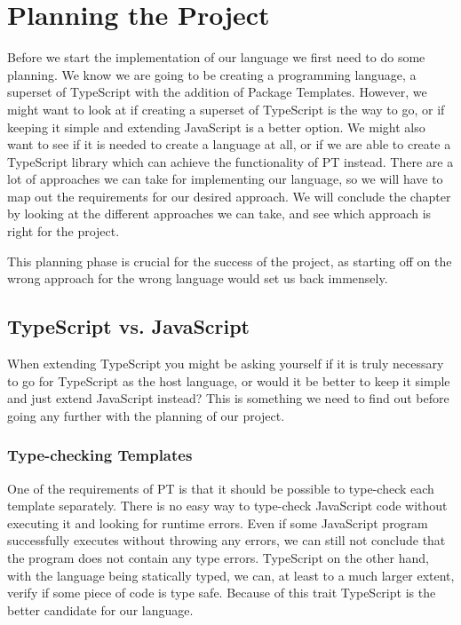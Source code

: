 
\chapter{Planning the Project}\label{ch:planning-the-project}

Before we start the implementation of our language we first need to do some planning.
We know we are going to be creating a programming language, a superset of TypeScript with the addition of Package Templates.
However, we might want to look at if creating a superset of TypeScript is the way to go, or if keeping it simple and extending JavaScript is a better option.
We might also want to see if it is needed to create a language at all, or if we are able to create a TypeScript library which can achieve the functionality of PT instead.
There are a lot of approaches we can take for implementing our language, so we will have to map out the requirements for our desired approach.
We will conclude the chapter by looking at the different approaches we can take, and see which approach is right for the project.

This planning phase is crucial for the success of the project, as starting off on the wrong approach for the wrong language would set us back immensely.

\section{TypeScript vs. JavaScript}\label{sec:typescript-vs-javascript}

When extending TypeScript you might be asking yourself if it is truly necessary to go for TypeScript as the host language, or would it be better to keep it simple and just extend JavaScript instead?
This is something we need to find out before going any further with the planning of our project.

\subsection{Type-checking Templates}\label{subsec:why-typescript-verifying-templates}

One of the requirements of PT is that it should be possible to type-check each template separately.
There is no easy way to type-check JavaScript code without executing it and looking for runtime errors.
Even if some JavaScript program successfully executes without throwing any errors, we can still not conclude that the program does not contain any type errors.
TypeScript on the other hand, with the language being statically typed, we can, at least to a much larger extent, verify if some piece of code is type safe.
Because of this trait TypeScript is the better candidate for our language.

